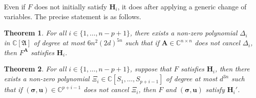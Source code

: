 \documentclass[a4paper]{article}
\def\A{\mathfrak{A}}
\def\mA{{\bm A}}
\def\ub{{\bm u}}
\def\D{\Delta}
\def\C{\mathbb{C}}
\newtheorem{theorem}{Theorem}[section]
\begin{document}
\noindent
Even if $F$ does not initially satisfy $\textbf{H}_i$, it does after applying a generic change of variables. The precise
statement is as follows.  
%
\begin{theorem}\label{theo:gen}
  For all $i\in\{1,\dots,n-p+1\}$, there exists a non-zero polynomial $\D_i$ in
  $\C[\A]$ of degree at most $6n^2(2d)^{5n}$ such that if $\mA \in
  \C^{n\times n}$ does not cancel $\D_i$, then
  $F^\mA$ satisfies $\textbf{H}_i$.
\end{theorem}
%
\begin{theorem}\label{theo:Hp}
  For all $i\in\{1,\dots,n-p+1\}$, suppose that $F$ satisfies $\textbf{H}_i$, then there exists a non-zero
  polynomial $\Xi_{i} \in \C[S_1,\dots,S_{p+i-1}]$ of degree at most
  $d^{3n}$ such that if $(\bm \sigma,\ub) \in \C^{p+i-1}$ does not
  cancel $\Xi_{i}$, then $F$ and $(\bm \sigma,\ub)$ satisfy $\textbf{H}_i'$.
\end{theorem}



\end{document}
